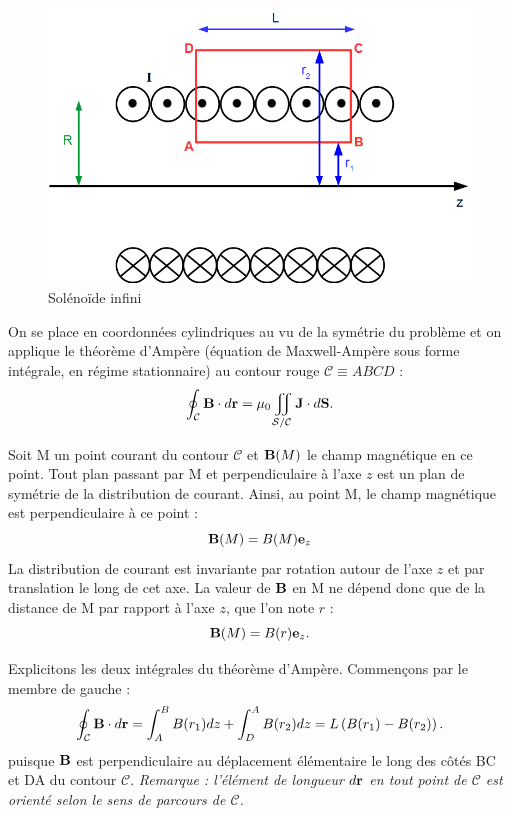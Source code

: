 \documentclass[11pt,a4paper]{report}
\begin{document}
		\begin{figure}[h!]
		\begin{center}
			\includegraphics[scale = 0.4]{solenoid_infini.png}
			\caption{Solénoïde infini} 
			\label{fig:solenoid_infini}
		\end{center}
		\end{figure}

On se place en coordonnées cylindriques au vu de la symétrie du problème et on applique le théorème d'Ampère (équation de Maxwell-Ampère sous forme intégrale, en régime stationnaire) au contour rouge $\mathcal{C} \equiv ABCD $ :
\begin{equation}
	\oint_\mathcal{C}\bold{B}\cdot d\bold{r} = \mu_0 \iint_{\mathcal{S}/\mathcal{C}}\bold{J}\cdot d\bold{S}.
\end{equation}

Soit M un point courant du contour $\mathcal{C}$ et $\bold{B}(M)$ le champ magnétique en ce point. Tout plan passant par M et perpendiculaire à l'axe $z$ est un plan de symétrie de la distribution de courant. Ainsi, au point M, le champ magnétique est perpendiculaire à ce point :
\begin{equation}
	\bold{B}(M) = B(M) \bold{e}_z 
\end{equation}
La distribution de courant est invariante par rotation autour de l'axe $z$ et par translation le long de cet axe. La valeur de $\bold{B}$ en M ne dépend donc que de la distance de M par rapport à l'axe $z$, que l'on note $r$ :
\begin{equation}
	\bold{B}(M) = B(r) \bold{e}_z.
\end{equation}

Explicitons les deux intégrales du théorème d'Ampère. Commençons par le membre de gauche :
\begin{equation}
	\oint_\mathcal{C}\bold{B}\cdot d\bold{r} = \int_{A}^{B} B(r_1) dz + \int_{D}^{A}  B(r_2) dz = L \left( B(r_1) - B(r_2) \right).
\end{equation}
puisque $\bold{B}$ est perpendiculaire au déplacement élémentaire le long des côtés BC et DA du contour $\mathcal{C}$.
\textit{Remarque : l'élément de longueur $d\bold{r}$ en tout point de $\mathcal{C}$ est orienté selon le sens de parcours de $\mathcal{C}$.}
\end{document}
